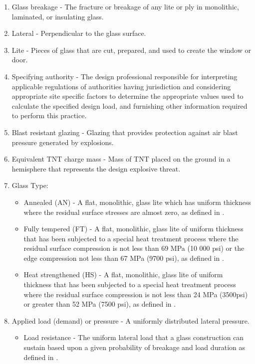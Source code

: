 \documentclass[12pt]{article}
\begin{document}
\begin{enumerate}
\item{Glass breakage - The fracture or breakage of any lite or ply in monolithic, laminated, or insulating glass.}
\item{Lateral - Perpendicular to the glass surface.}
\item{Lite - Pieces of glass that are cut, prepared, and used to create the window or door.}
\item{Specifying authority - The design professional responsible for interpreting applicable regulations of authorities having jurisdiction and considering appropriate site specific factors to determine the appropriate values used to calculate the specified design load, and furnishing other information required to perform this practice.}
\item{Blast resistant glazing - Glazing that provides protection against air blast pressure generated by explosions.}
\item{Equivalent TNT charge mass - Mass of TNT placed on the ground in a hemisphere that represents the design explosive threat.}
\item{Glass Type:}
\begin{itemize}
\item{Annealed (AN) - A flat, monolithic, glass lite which has uniform thickness where the residual surface stresses are almost zero, as defined in \cite{astm2016}.}
\item{Fully tempered (FT) - A flat, monolithic, glass lite of uniform thickness that has been subjected to a special heat treatment process where the residual surface compression is not less than 69 MPa (10 000 psi) or the edge compression not less than 67 MPa (9700 psi), as defined in \cite{astm2012}.}
\item{Heat strengthened (HS) - A flat, monolithic, glass lite of uniform thickness that has been subjected to a special heat treatment process where the residual surface compression is not less than 24 MPa (3500psi) or greater than 52 MPa (7500 psi), as defined in \cite{astm2012}.}
\end{itemize}
\item{Applied load (demand) or pressure - A uniformly distributed lateral pressure.}
\begin{itemize}
\item{Load resistance - The uniform lateral load that a glass construction can sustain based upon a given probability of breakage and load duration as defined in \cite[(pp. 1 and 53)]{astm2009}.}

\end{itemize}
\end{enumerate}
\end{document}
